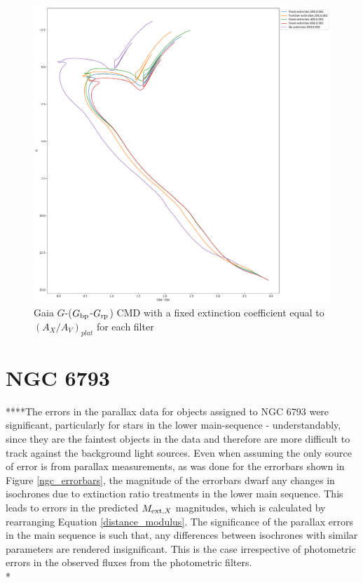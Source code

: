 \documentclass[12pt, a4paper]{report}
\begin{document}
\begin{figure}[h]
\begin{center}
\includegraphics[scale=0.25]{../basti_isochrones_10_13Gyr/Extinction_T50k_FeH0fix_func_G_GbpmGrp_500_400_600_Myr_FeH_0p002_ref_noext_Av_1p0.pdf}
\caption{Gaia $G$-($G_{\textnormal{bp}}$-$G_{\textnormal{rp}}$) CMD with a fixed extinction coefficient equal to $(A_{X}/A_{V})_{plat}$ for each filter}
\label{gaia_isoc_T50k}
\end{center}
\end{figure}

\section{NGC 6793}

****The errors in the parallax data for objects assigned to NGC 6793 were significant, particularly for stars in the lower main-sequence - understandably, since they are the faintest objects in the data and therefore are more difficult to track against the background light sources. Even when assuming the only source of error is from  parallax measurements, as was done for the errorbars shown in Figure \ref{ngc_errorbars}, the magnitude of the errorbars dwarf any changes in isochrones due to extinction ratio treatments in the lower main sequence. This leads to errors in the predicted $M_{\textnormal{ext},X}$ magnitudes, which is calculated by rearranging Equation \ref{distance_modulus}. The significance of the parallax errors in the main sequence is such that, any differences between isochrones with similar parameters are rendered insignificant. This is the case irrespective of photometric errors in the observed fluxes from the photometric filters.\\*
\end{document}
